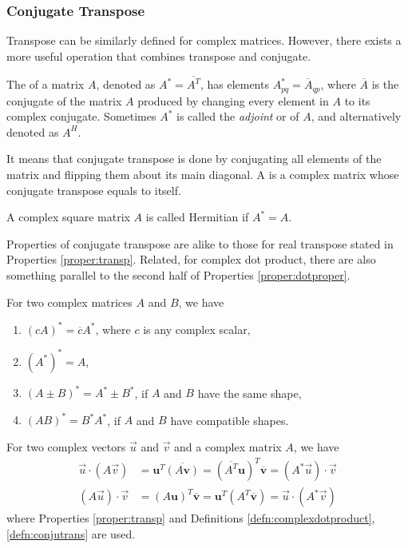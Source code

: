 \subsubsection{Conjugate Transpose}
Transpose can be similarly defined for complex matrices. However, there exists a more useful operation that combines transpose and conjugate.
\begin{defn}
\label{defn:conjutrans}
The  of a matrix $A$, denoted as $A^* = \overline{A^T}$, has elements $A^*_{pq} = \overline{A}_{qp}$, where $\overline{A}$ is the conjugate of the matrix $A$ produced by changing every element in $A$ to its complex conjugate. Sometimes $A^*$ is called the \textit{adjoint} or  of $A$, and alternatively denoted as $A^H$. 
\end{defn}
It means that conjugate transpose is done by conjugating all elements of the matrix and flipping them about its main diagonal. A  is a complex matrix whose conjugate transpose equals to itself.
\begin{defn}
\label{defn:Hermitian}
A complex square matrix $A$ is called Hermitian if $A^* = A$.
\end{defn}
Properties of conjugate transpose are alike to those for real transpose stated in Properties \ref{proper:transp}. Related, for complex dot product, there are also something parallel to the second half of Properties \ref{proper:dotproper}.
\begin{proper}
\label{proper:complexmat}
For two complex matrices $A$ and $B$, we have
\begin{enumerate}
\item $(cA)^* = \overline{c}A^*$, where $c$ is any complex scalar,
\item $(A^*)^* = A$,
\item $(A \pm B)^* = A^* \pm B^*$, if $A$ and $B$ have the same shape,
\item $(AB)^* = B^*A^*$, if $A$ and $B$ have compatible shapes.
\end{enumerate}
\end{proper}
\begin{proper}
\label{proper:complexdotherm}
For two complex vectors $\vec{u}$ and $\vec{v}$ and a complex matrix $A$, we have 
\begin{align*}
\vec{u} \cdot (A\vec{v}) &= \textbf{u}^T\overline{(A\textbf{v})} = (\overline{A^T}\textbf{u})^T\overline{\textbf{v}} = (A^*\vec{u}) \cdot \vec{v} \\
(A\vec{u}) \cdot \vec{v} &= (A\textbf{u})^T\overline{\textbf{v}} = \textbf{u}^T(A^T\overline{\textbf{v}}) = \vec{u} \cdot (A^*\vec{v})
\end{align*}
where Properties \ref{proper:transp} and Definitions \ref{defn:complexdotproduct}, \ref{defn:conjutrans} are used.
\end{proper}

